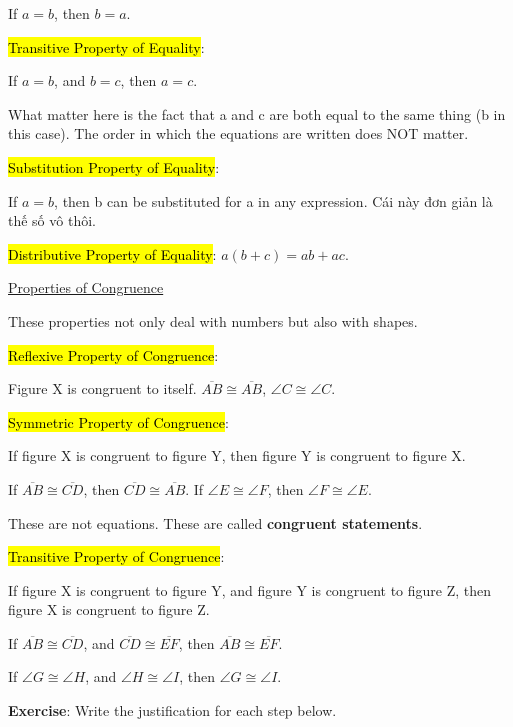 If $a=b$, then $b=a$.

\hl{Transitive Property of Equality}:

If $a=b$, and $b=c$, then $a=c$.

What matter here is the fact that a and c are both equal to the same thing (b in this case). The order in which the equations are written does NOT matter.

\hl{Substitution Property of Equality}:

If $a=b$, then b can be substituted for a in any expression. Cái này đơn giản là thế số vô thôi.

\hl{Distributive Property of Equality}: $a(b+c)=ab+ac$.

\vspace{0.5 cm}

\centerline{\underline{\LARGE Properties of Congruence}}

\vspace{0.5cm}

These properties not only deal with numbers but also with shapes.

\vspace{.3cm}

\hl{Reflexive Property of Congruence}:

Figure X is congruent to itself. $\overline{AB} \cong \overline{AB}$, $\angle C \cong \angle C$.

\hl{Symmetric Property of Congruence}:

If figure X is congruent to figure Y, then figure Y is congruent to figure X.

If $\overline{AB} \cong \overline{CD}$, then $\overline{CD} \cong \overline{AB}$. If $\angle E \cong \angle F$, then $\angle F \cong \angle E$.

These are not equations. These are called \textbf{congruent statements}.

\hl{Transitive Property of Congruence}:

If figure X is congruent to figure Y, and figure Y is congruent to figure Z, then figure X is congruent to figure Z.

If $\overline{AB} \cong \overline{CD}$, and $\overline{CD} \cong \overline{EF}$, then $\overline{AB} \cong \overline{EF}$.

If $\angle G \cong \angle H$, and $\angle H \cong \angle I$, then $\angle G \cong \angle I$.

\vspace{.5cm}

\textbf{Exercise}: Write the justification for each step below.

